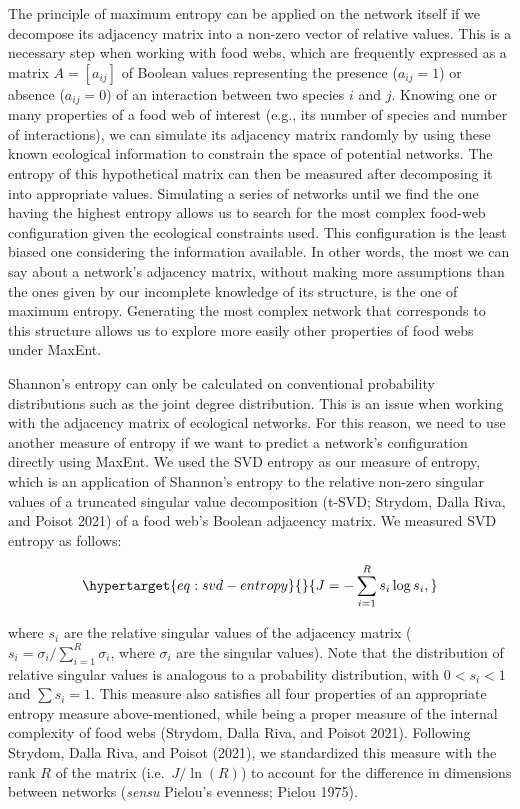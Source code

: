 \documentclass[10pt,oneside]{article}
\begin{document}
The principle of maximum entropy can be applied on the network itself if
we decompose its adjacency matrix into a non-zero vector of relative
values. This is a necessary step when working with food webs, which are
frequently expressed as a matrix \(A = [a_{ij}]\) of Boolean values
representing the presence (\(a_{ij} = 1\)) or absence (\(a_{ij} = 0\))
of an interaction between two species \(i\) and \(j\). Knowing one or
many properties of a food web of interest (e.g., its number of species
and number of interactions), we can simulate its adjacency matrix
randomly by using these known ecological information to constrain the
space of potential networks. The entropy of this hypothetical matrix can
then be measured after decomposing it into appropriate values.
Simulating a series of networks until we find the one having the highest
entropy allows us to search for the most complex food-web configuration
given the ecological constraints used. This configuration is the least
biased one considering the information available. In other words, the
most we can say about a network's adjacency matrix, without making more
assumptions than the ones given by our incomplete knowledge of its
structure, is the one of maximum entropy. Generating the most complex
network that corresponds to this structure allows us to explore more
easily other properties of food webs under MaxEnt.

Shannon's entropy can only be calculated on conventional probability
distributions such as the joint degree distribution. This is an issue
when working with the adjacency matrix of ecological networks. For this
reason, we need to use another measure of entropy if we want to predict
a network's configuration directly using MaxEnt. We used the SVD entropy
as our measure of entropy, which is an application of Shannon's entropy
to the relative non-zero singular values of a truncated singular value
decomposition (t-SVD; Strydom, Dalla Riva, and Poisot 2021) of a food
web's Boolean adjacency matrix. We measured SVD entropy as follows:

\begin{equation}\protect\hypertarget{eq:svd-entropy}{}{J = -\sum_{i=1}^R s_i \log s_i,}\label{eq:svd-entropy}\end{equation}

where \(s_i\) are the relative singular values of the adjacency matrix
(\(s_i = \sigma_i / \sum_{i = 1}^R \sigma_i\), where \(\sigma_i\) are
the singular values). Note that the distribution of relative singular
values is analogous to a probability distribution, with \(0 < s_i < 1\)
and \(\sum s_i = 1\). This measure also satisfies all four properties of
an appropriate entropy measure above-mentioned, while being a proper
measure of the internal complexity of food webs (Strydom, Dalla Riva,
and Poisot 2021). Following Strydom, Dalla Riva, and Poisot (2021), we
standardized this measure with the rank \(R\) of the matrix
(i.e.~\(J / \ln(R)\)) to account for the difference in dimensions
between networks (\emph{sensu} Pielou's evenness; Pielou 1975).
\end{document}
